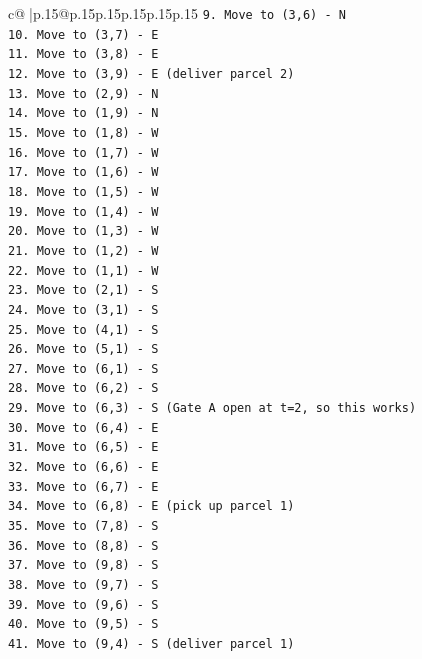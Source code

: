 \documentclass{article}
\begin{document}
{\begin{supertabular}{c@{$\;$}|p{.15\linewidth}@{}p{.15\linewidth}p{.15\linewidth}p{.15\linewidth}p{.15\linewidth}p{.15\linewidth}}
{{{\texttt{9. Move to (3,6) {-} N} \\
\texttt{10. Move to (3,7) {-} E} \\
\texttt{11. Move to (3,8) {-} E} \\
\texttt{12. Move to (3,9) {-} E (deliver parcel 2)} \\
\texttt{13. Move to (2,9) {-} N} \\
\texttt{14. Move to (1,9) {-} N} \\
\texttt{15. Move to (1,8) {-} W} \\
\texttt{16. Move to (1,7) {-} W} \\
\texttt{17. Move to (1,6) {-} W} \\
\texttt{18. Move to (1,5) {-} W} \\
\texttt{19. Move to (1,4) {-} W} \\
\texttt{20. Move to (1,3) {-} W} \\
\texttt{21. Move to (1,2) {-} W} \\
\texttt{22. Move to (1,1) {-} W} \\
\texttt{23. Move to (2,1) {-} S} \\
\texttt{24. Move to (3,1) {-} S} \\
\texttt{25. Move to (4,1) {-} S} \\
\texttt{26. Move to (5,1) {-} S} \\
\texttt{27. Move to (6,1) {-} S} \\
\texttt{28. Move to (6,2) {-} S} \\
\texttt{29. Move to (6,3) {-} S (Gate A open at t=2, so this works)} \\
\texttt{30. Move to (6,4) {-} E} \\
\texttt{31. Move to (6,5) {-} E} \\
\texttt{32. Move to (6,6) {-} E} \\
\texttt{33. Move to (6,7) {-} E} \\
\texttt{34. Move to (6,8) {-} E (pick up parcel 1)} \\
\texttt{35. Move to (7,8) {-} S} \\
\texttt{36. Move to (8,8) {-} S} \\
\texttt{37. Move to (9,8) {-} S} \\
\texttt{38. Move to (9,7) {-} S} \\
\texttt{39. Move to (9,6) {-} S} \\
\texttt{40. Move to (9,5) {-} S} \\
\texttt{41. Move to (9,4) {-} S (deliver parcel 1)} \\
}}}
\end{supertabular}}
\end{document}
